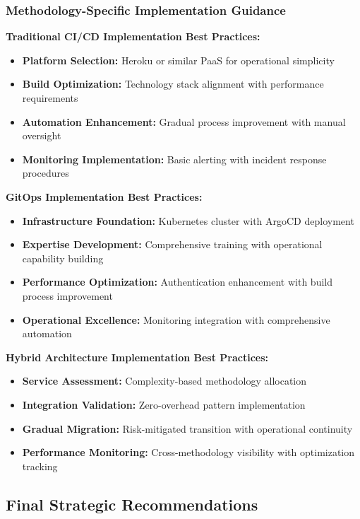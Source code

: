 \subsubsection{Methodology-Specific Implementation Guidance}

\textbf{Traditional CI/CD Implementation Best Practices:}
\begin{itemize}
\item \textbf{Platform Selection:} Heroku or similar PaaS for operational simplicity
\item \textbf{Build Optimization:} Technology stack alignment with performance requirements
\item \textbf{Automation Enhancement:} Gradual process improvement with manual oversight
\item \textbf{Monitoring Implementation:} Basic alerting with incident response procedures
\end{itemize}

\textbf{GitOps Implementation Best Practices:}
\begin{itemize}
\item \textbf{Infrastructure Foundation:} Kubernetes cluster with ArgoCD deployment
\item \textbf{Expertise Development:} Comprehensive training with operational capability building
\item \textbf{Performance Optimization:} Authentication enhancement with build process improvement
\item \textbf{Operational Excellence:} Monitoring integration with comprehensive automation
\end{itemize}

\textbf{Hybrid Architecture Implementation Best Practices:}
\begin{itemize}
\item \textbf{Service Assessment:} Complexity-based methodology allocation
\item \textbf{Integration Validation:} Zero-overhead pattern implementation
\item \textbf{Gradual Migration:} Risk-mitigated transition with operational continuity
\item \textbf{Performance Monitoring:} Cross-methodology visibility with optimization tracking
\end{itemize}

\subsection{Final Strategic Recommendations}
\label{subsec:final_recommendations}

